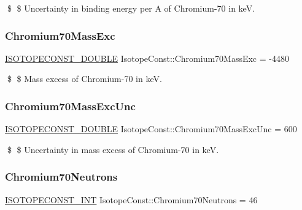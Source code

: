 \$ \$ Uncertainty in binding energy per A of Chromium-\/70 in keV. \mbox{\label{group___isotope_const-_chromium-_cr70_ga708bf3952078b215183b7068bc74eb3a}} 
\subsubsection{\texorpdfstring{Chromium70\+Mass\+Exc}{Chromium70MassExc}}
{\footnotesize\ttfamily \mbox{\hyperlink{group___isotope_const-_macros_ga8f45a7272ce02c0b4c65c44636ed719a}{I\+S\+O\+T\+O\+P\+E\+C\+O\+N\+S\+T\+\_\+\+D\+O\+U\+B\+LE}} Isotope\+Const\+::\+Chromium70\+Mass\+Exc = -\/4480}

\$ \$ Mass excess of Chromium-\/70 in keV. \mbox{\label{group___isotope_const-_chromium-_cr70_gabd7214e9854198fb5e7c7bf234d5f0f6}} 
\subsubsection{\texorpdfstring{Chromium70\+Mass\+Exc\+Unc}{Chromium70MassExcUnc}}
{\footnotesize\ttfamily \mbox{\hyperlink{group___isotope_const-_macros_ga8f45a7272ce02c0b4c65c44636ed719a}{I\+S\+O\+T\+O\+P\+E\+C\+O\+N\+S\+T\+\_\+\+D\+O\+U\+B\+LE}} Isotope\+Const\+::\+Chromium70\+Mass\+Exc\+Unc = 600}

\$ \$ Uncertainty in mass excess of Chromium-\/70 in keV. \mbox{\label{group___isotope_const-_chromium-_cr70_gaf515623e700ea946aef79d0fb7286589}} 
\subsubsection{\texorpdfstring{Chromium70\+Neutrons}{Chromium70Neutrons}}
{\footnotesize\ttfamily \mbox{\hyperlink{group___isotope_const-_macros_ga5f18360b3e99483a35c32d789e62621c}{I\+S\+O\+T\+O\+P\+E\+C\+O\+N\+S\+T\+\_\+\+I\+NT}} Isotope\+Const\+::\+Chromium70\+Neutrons = 46}

